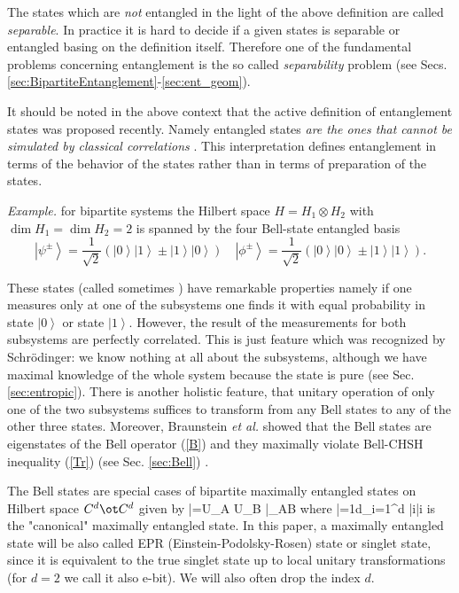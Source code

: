 \documentclass[rmp,12pt,preprint]{revtex4-2}
\begin{document}
The states which are {\it not} entangled in the light of the above
definition are called {\it separable}. In practice it is hard to
decide if a given states is separable or entangled basing on the
definition itself. Therefore one of the fundamental problems
concerning entanglement is the so called {\it separability} problem
(see Secs. \ref{sec:BipartiteEntanglement}-\ref{sec:ent_geom}).

It should be noted in the above context that the active definition of entanglement states was proposed recently.  Namely entangled states
{\it are the ones that cannot be simulated by classical correlations}
\cite{MasanesLD2007}.
This interpretation defines entanglement in terms of the behavior of the states rather than in terms of preparation of the states.

{\it Example. }for bipartite systems the Hilbert space
$\textit{H}=\textit{H}_1 \otimes\textit{H}_2$ with $\dim H_1=\dim
H_2=2$ is spanned by the four Bell-state entangled basis
\begin{equation}
\left|\psi^\pm\right\rangle=\frac{1}{\sqrt{2}}(\left|0\right\rangle \left|1\right\rangle\pm \left|1\right\rangle \left|0\right\rangle) \quad
\left|\phi^\pm\right\rangle=\frac{1}{\sqrt{2}}(\left|0\right\rangle \left|0\right\rangle\pm \left|1\right\rangle \left|1\right\rangle).
\label{basis}
\end{equation}

These states (called sometimes \eprstates) have remarkable properties
namely if one measures only at one of the subsystems one finds it with
equal probability in state $\left|0\right\rangle$ or state
$\left|1\right\rangle$.  However, the result of the measurements for
both subsystems are perfectly correlated. This is just feature which
was recognized by Schr{\"o}dinger: we know nothing at all about the
subsystems, although we have maximal knowledge of the whole system
because the state is pure (see Sec. \ref{sec:entropic}).  There is
another holistic feature, that unitary operation of only one of the
two subsystems suffices to transform from any Bell states to any of
the other three states. Moreover, Braunstein \emph{et al.}  showed
that the Bell states are eigenstates of the Bell operator (\ref{B})
and they maximally violate Bell-CHSH inequality (\ref{Tr}) (see
Sec. \ref{sec:Bell}) \cite {Braunstein2}.

The Bell states are special cases of bipartite maximally entangled
states on Hilbert space $C^d\ot C^d$ given by
\be
|\psi\>=U_A \ot U_B |\Phiplusd\>_{AB}
\ee
where
\be
|\Phiplusd\>={1\over \sqrt d}\sum_{i=1}^d |i\>|i\>
\ee
is the "canonical" maximally entangled state.
In this paper, a maximally entangled state will be  also
called EPR (Einstein-Podolsky-Rosen) state or singlet state, since it is equivalent to the true singlet state up to local unitary transformations (for $d = 2$ we call it also e-bit). We will also often drop the index $d$.
\end{document}
